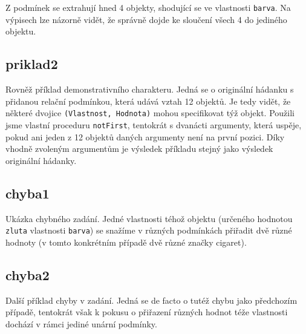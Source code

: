 \documentclass[11pt]{article} %
\begin{document}
Z podmínek se extrahují hned 4 objekty, shodující se ve vlastnosti \texttt{barva}. Na výpisech lze názorně vidět, že správně dojde ke sloučení všech 4 do jediného objektu.

\subsection{priklad2}
Rovněž příklad demonstrativního charakteru. Jedná se o originální hádanku s přidanou relační podmínkou, která udává vztah 12 objektů. Je tedy vidět, že některé dvojice \texttt{(Vlastnost, Hodnota)} mohou specifikovat týž objekt. Použili jsme vlastní proceduru \texttt{notFirst}, tentokrát s dvanácti argumenty, která uspěje, pokud ani jeden z 12 objektů daných argumenty není na první pozici. Díky vhodně zvoleným argumentům je výsledek příkladu stejný jako výsledek originální hádanky.

\subsection{chyba1}
Ukázka chybného zadání. Jedné vlastnosti téhož objektu (určeného hodnotou \texttt{zluta} vlastnosti \texttt{barva}) se snažíme v různých podmínkách přiřadit dvě různé hodnoty (v tomto konkrétním případě dvě různé značky cigaret).

\subsection{chyba2}
Další příklad chyby v zadání. Jedná se de facto o tutéž chybu jako předchozím případě, tentokrát však k pokusu o přiřazení různých hodnot téže vlastnosti dochází v rámci jediné unární podmínky.
\end{document}
